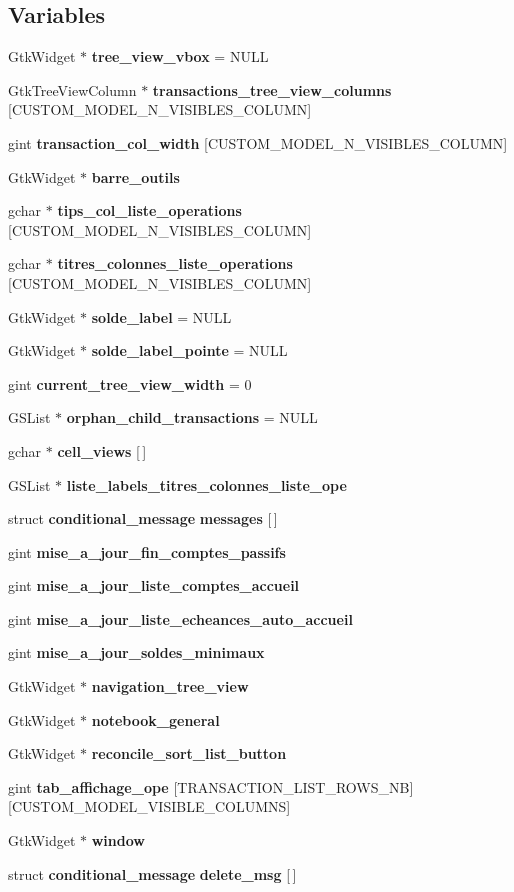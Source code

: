 \subsection*{Variables}
\begin{DoxyCompactItemize}
\item 
GtkWidget $\ast$ {\bf tree\_\-view\_\-vbox} = NULL
\item 
GtkTreeViewColumn $\ast$ {\bf transactions\_\-tree\_\-view\_\-columns} [CUSTOM\_\-MODEL\_\-N\_\-VISIBLES\_\-COLUMN]
\item 
gint {\bf transaction\_\-col\_\-width} [CUSTOM\_\-MODEL\_\-N\_\-VISIBLES\_\-COLUMN]
\item 
GtkWidget $\ast$ {\bf barre\_\-outils}
\item 
gchar $\ast$ {\bf tips\_\-col\_\-liste\_\-operations} [CUSTOM\_\-MODEL\_\-N\_\-VISIBLES\_\-COLUMN]
\item 
gchar $\ast$ {\bf titres\_\-colonnes\_\-liste\_\-operations} [CUSTOM\_\-MODEL\_\-N\_\-VISIBLES\_\-COLUMN]
\item 
GtkWidget $\ast$ {\bf solde\_\-label} = NULL
\item 
GtkWidget $\ast$ {\bf solde\_\-label\_\-pointe} = NULL
\item 
gint {\bf current\_\-tree\_\-view\_\-width} = 0
\item 
GSList $\ast$ {\bf orphan\_\-child\_\-transactions} = NULL
\item 
gchar $\ast$ {\bf cell\_\-views} [$\,$]
\item 
GSList $\ast$ {\bf liste\_\-labels\_\-titres\_\-colonnes\_\-liste\_\-ope}
\item 
struct {\bf conditional\_\-message} {\bf messages} [$\,$]
\item 
gint {\bf mise\_\-a\_\-jour\_\-fin\_\-comptes\_\-passifs}
\item 
gint {\bf mise\_\-a\_\-jour\_\-liste\_\-comptes\_\-accueil}
\item 
gint {\bf mise\_\-a\_\-jour\_\-liste\_\-echeances\_\-auto\_\-accueil}
\item 
gint {\bf mise\_\-a\_\-jour\_\-soldes\_\-minimaux}
\item 
GtkWidget $\ast$ {\bf navigation\_\-tree\_\-view}
\item 
GtkWidget $\ast$ {\bf notebook\_\-general}
\item 
GtkWidget $\ast$ {\bf reconcile\_\-sort\_\-list\_\-button}
\item 
gint {\bf tab\_\-affichage\_\-ope} [TRANSACTION\_\-LIST\_\-ROWS\_\-NB][CUSTOM\_\-MODEL\_\-VISIBLE\_\-COLUMNS]
\item 
GtkWidget $\ast$ {\bf window}
\item 
struct {\bf conditional\_\-message} {\bf delete\_\-msg} [$\,$]
\end{DoxyCompactItemize}


